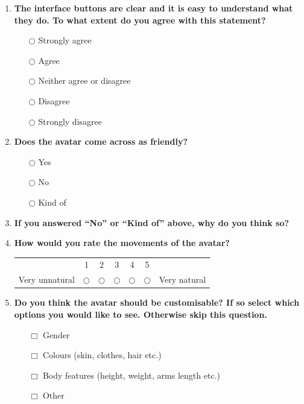 \documentclass[12pt]{ociamthesis}  %
\begin{document}
{\begin{enumerate}[resume]
	\item \textbf{The interface buttons are clear and it is easy to understand what they do. To what extent do you agree with this statement?}
	\begin{enumerate}
		\item[$\bigcirc$] Strongly agree
		\item[$\bigcirc$] Agree
		\item[$\bigcirc$] Neither agree or disagree
		\item[$\bigcirc$] Disagree
		\item[$\bigcirc$] Strongly disagree
	\end{enumerate}
	
	\item \textbf{Does the avatar come across as friendly?}
	\begin{enumerate}
		\item[$\bigcirc$] Yes
		\item[$\bigcirc$] No
		\item[$\bigcirc$] Kind of
	\end{enumerate}	
	
	\item \textbf{If you answered ``No'' or ``Kind of'' above, why do you think so?}
	\par \dotfill
	
	\item \textbf{How would you rate the movements of the avatar?}
	\begin{center}
	\begin{tabular}{c c c c c c c}
	& 1 & 2 & 3 & 4 & 5 & \\
	Very unnatural & $\bigcirc$ & $\bigcirc$ & $\bigcirc$ & $\bigcirc$ & $\bigcirc$ & Very natural
	\end{tabular}
	\end{center}
	
	\item \textbf{Do you think the avatar should be customisable? If so select which options you would like to see. Otherwise skip this question.}
	\begin{enumerate}
		\item[$\Box$] Gender
		\item[$\Box$] Colours (skin, clothes, hair etc.)
		\item[$\Box$] Body features (height, weight, arms length etc.)
		\item[$\Box$] Other \dotfill
	\end{enumerate}
	

\end{enumerate}}
\end{document}
